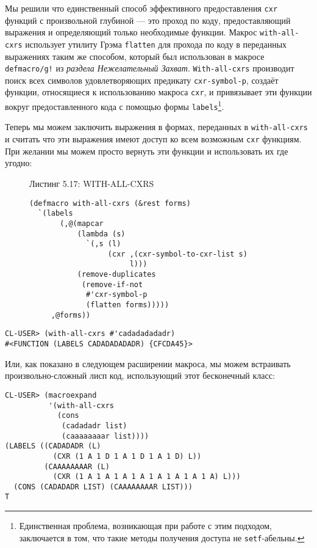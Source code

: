 Мы решили что единственный способ эффективного предоставления \verb"cxr" функций с произвольной глубиной --- это проход по коду, предоставляющий выражения и определяющий только необходимые функции. Макрос \verb"with-all-cxrs" использует утилиту Грэма \verb"flatten" для прохода по коду в переданных выражениях таким же способом, который был использован в макросе \verb"defmacro/g!" из \emph{раздела Нежелательный Захват}. \verb"With-all-cxrs" производит поиск всех символов удовлетворяющих предикату \verb"cxr-symbol-p", создаёт функции, относящиеся к использованию макроса \verb"cxr", и привязывает эти функции вокруг предоставленного кода с помощью формы \verb"labels"\footnote{Единственная проблема, возникающая при работе с этим подходом, заключается в том, что такие методы получения доступа не \verb"setf"-абельны.}.

Теперь мы можем заключить выражения в формах, переданных в \verb"with-all-cxrs" и считать что эти выражения имеют доступ ко всем возможным \verb"cxr" функциям. При желании мы можем просто вернуть эти функции и использовать их где угодно:

\begin{figure}Листинг 5.17: WITH-ALL-CXRS\label{listing_5.17}
\listbegin
\begin{verbatim}
(defmacro with-all-cxrs (&rest forms)
  `(labels
       (,@(mapcar
           (lambda (s)
             `(,s (l)
                  (cxr ,(cxr-symbol-to-cxr-list s)
                       l)))
           (remove-duplicates
            (remove-if-not
             #'cxr-symbol-p
             (flatten forms)))))
     ,@forms))
\end{verbatim}
\listend
\end{figure}

\begin{verbatim}
CL-USER> (with-all-cxrs #'cadadadadadr)
#<FUNCTION (LABELS CADADADADADR) {CFCDA45}>
\end{verbatim}

Или, как показано в следующем расширении макроса, мы можем встраивать произвольно-сложный лисп код, использующий этот бесконечный класс:

\begin{verbatim}
CL-USER> (macroexpand
          '(with-all-cxrs
            (cons
             (cadadadr list)
             (caaaaaaaar list))))
(LABELS ((CADADADR (L)
           (CXR (1 A 1 D 1 A 1 D 1 A 1 D) L))
         (CAAAAAAAAR (L)
           (CXR (1 A 1 A 1 A 1 A 1 A 1 A 1 A 1 A) L)))
  (CONS (CADADADR LIST) (CAAAAAAAAR LIST)))
T
\end{verbatim}

